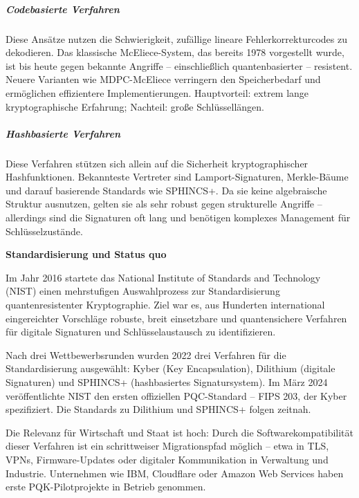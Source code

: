 \subparagraph{Codebasierte Verfahren}
Diese Ansätze nutzen die Schwierigkeit, zufällige lineare Fehlerkorrekturcodes zu dekodieren. Das klassische McEliece-System, das bereits 1978 vorgestellt wurde, ist bis heute gegen bekannte Angriffe – einschließlich quantenbasierter – resistent. Neuere Varianten wie MDPC-McEliece verringern den Speicherbedarf und ermöglichen effizientere Implementierungen. Hauptvorteil: extrem lange kryptographische Erfahrung; Nachteil: große Schlüssellängen. \cite{misoczki_r_et_al_mdpc-mceliece_2013, bernstein_et_al_post-quantum_2009}
 
\subparagraph{Hashbasierte Verfahren}
Diese Verfahren stützen sich allein auf die Sicherheit kryptographischer Hashfunktionen. Bekannteste Vertreter sind Lamport-Signaturen, Merkle-Bäume und darauf basierende Standards wie SPHINCS+. Da sie keine algebraische Struktur ausnutzen, gelten sie als sehr robust gegen strukturelle Angriffe – allerdings sind die Signaturen oft lang und benötigen komplexes Management für Schlüsselzustände. \cite{lamport_l_constructing_1979, bernstein_et_al_post-quantum_2009, chen_l_et_al_report_2016}


\vspace{1em}
\noindent\textbf{Standardisierung und Status quo}

\noindent
Im Jahr 2016 startete das National Institute of Standards and Technology (NIST) einen mehrstufigen Auswahlprozess zur Standardisierung quantenresistenter Kryptographie. Ziel war es, aus Hunderten international eingereichter Vorschläge robuste, breit einsetzbare und quantensichere Verfahren für digitale Signaturen und Schlüsselaustausch zu identifizieren. \cite{alagic_g_et_al_status_2023}

\noindent
Nach drei Wettbewerbsrunden wurden 2022 drei Verfahren für die Standardisierung ausgewählt: Kyber (Key Encapsulation), Dilithium (digitale Signaturen) und SPHINCS+ (hashbasiertes Signatursystem). Im März 2024 veröffentlichte NIST den ersten offiziellen PQC-Standard – FIPS 203, der Kyber spezifiziert. Die Standards zu Dilithium und SPHINCS+ folgen zeitnah. \cite{nist_fips_2024}

\noindent
Die Relevanz für Wirtschaft und Staat ist hoch: Durch die Softwarekompatibilität dieser Verfahren ist ein schrittweiser Migrationspfad möglich – etwa in TLS, VPNs, Firmware-Updates oder digitaler Kommunikation in Verwaltung und Industrie. Unternehmen wie IBM, Cloudflare oder Amazon Web Services haben erste PQK-Pilotprojekte in Betrieb genommen. \cite{alagic_g_et_al_status_2023}
 

